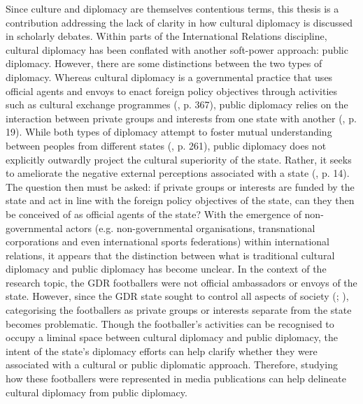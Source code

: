 Since culture and diplomacy are themselves contentious terms, this thesis is a contribution addressing the lack of clarity in how cultural diplomacy is discussed in scholarly debates. Within parts of the International Relations discipline, cultural diplomacy has been conflated with another soft-power approach: public diplomacy. However, there are some distinctions between the two types of diplomacy. Whereas cultural diplomacy is a governmental practice that uses official agents and envoys to enact foreign policy objectives through activities such as cultural exchange programmes (\cite{ang2015}, p. 367), public diplomacy relies on the interaction between private groups and interests from one state with another (\cite{cull2008b}, p. 19). While both types of diplomacy attempt to foster mutual understanding between peoples from different states (\cite{hartig2016}, p. 261), public diplomacy does not explicitly outwardly project the cultural superiority of the state. Rather, it seeks to ameliorate the negative external perceptions associated with a state (\cite{melissen2011}, p. 14). The question then must be asked: if private groups or interests are funded by the state and act in line with the foreign policy objectives of the state, can they then be conceived of as official agents of the state? With the emergence of non-governmental actors (e.g. non-governmental organisations, transnational corporations and even international sports federations) within international relations, it appears that the distinction between what is traditional cultural diplomacy and public diplomacy has become unclear. In the context of the research topic, the GDR footballers were not official ambassadors or envoys of the state. However, since the GDR state sought to control all aspects of society (\cite{fullbrook1995}; \cite{dennis2000}), categorising the footballers as private groups or interests separate from the state becomes problematic. Though the footballer’s activities can be recognised to occupy a liminal space between cultural diplomacy and public diplomacy, the intent of the state’s diplomacy efforts can help clarify whether they were associated with a cultural or public diplomatic approach. Therefore, studying how these footballers were represented in media publications can help delineate cultural diplomacy from public diplomacy.

